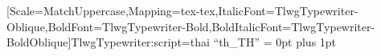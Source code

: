   \usepackage{fontspec}
  \usepackage{polyglossia}
  \usepackage[Latin,Thai]{ucharclasses}
  \setdefaultlanguage{thai}
  \newfontfamily{\thaifont}[Scale=MatchUppercase,Mapping=tex-tex,ItalicFont={TlwgTypewriter-Oblique},BoldFont={TlwgTypewriter-Bold},BoldItalicFont={TlwgTypewriter-BoldOblique}]{TlwgTypewriter:script=thai}
  \XeTeXlinebreaklocale “th_TH”
  \XeTeXlinebreakskip = 0pt plus 1pt
  \linespread{1.5}

\usepackage{lshort}
\usepackage{todonotes}


  \frontmatter
